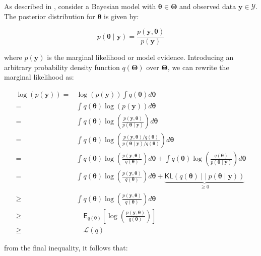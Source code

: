 As described in \cite{Ormerod2010-bc}, consider a Bayesian model with $\bm{\theta}\in\bm{\Theta}$ and observed data $\bm{y}\in\bm{\mathcal{Y}}$. The posterior distribution for $\bm{\theta}$ is given by:

\begin{equation}
\label{post_theta}
p(\bm{\theta}\mid\bm{y})=\frac{p(\bm{y},\bm{\theta})}{p(\bm{y})}
\end{equation}

where $p(\bm{y})$ is the marginal likelihood or model evidence. Introducing an arbitrary probability density function $q(\bm{\Theta})$ over $\bm{\Theta}$, we can rewrite the marginal likelihood as:

\begin{equation}
\label{lnPy}
\begin{split}
    \log({p(\bm{y})})=& \log (p(\bm{y}))\int q(\bm{\theta}) d\bm{\theta}\\
                    =& \int q(\bm{\theta}) \log (p(\bm{y})) d\bm{\theta}\\
                    =& \int q(\bm{\theta}) \log \left(\frac{p(\bm{y},\bm{\theta})}{p(\bm{\theta}\mid\bm{y})}\right) d\bm{\theta}\\
                    =& \int q(\bm{\theta}) \log \left(\frac{p(\bm{y},\bm{\theta})/q(\bm{\theta})}{p(\bm{\theta}\mid\bm{y})/q(\bm{\theta})}\right) d\bm{\theta}\\
                    =&  \int q(\bm{\theta}) \log \left(\frac{p(\bm{y},\bm{\theta})}{q(\bm{\theta})}\right)d\bm{\theta}+ \int q(\bm{\theta}) \log \left(\frac{q(\bm{\theta})}{p(\bm{\theta}\mid\bm{y})}\right)d\bm{\theta}\\
                    =&\int q(\bm{\theta}) \log \left(\frac{p(\bm{y},\bm{\theta})}{q(\bm{\theta})}\right)d\bm{\theta}+\underbrace{\mathsf{KL}\left(q(\bm{\theta})\mid\mid\ p(\bm{\theta}\mid\bm{y})\right)}_{\geq 0}\\
                    \geq&\int q(\bm{\theta}) \log \left(\frac{p(\bm{y},\bm{\theta})}{q(\bm{\theta})}\right)d\bm{\theta}\\
                    \geq&\quad \mathsf{E}_{q(\bm{\theta})}\left[ \log \left(\frac{p(\bm{y},\bm{\theta})}{q(\bm{\theta})}\right)\right]\\
                    \geq&\quad \mathcal{L}(q)
\end{split}
\end{equation}

from the final inequality, it follows that: 

